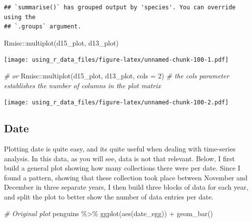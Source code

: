 \documentclass[
]{book}
\newenvironment{Shaded}{\begin{snugshade}}{\end{snugshade}}
\newcommand{\AttributeTok}[1]{\textcolor[rgb]{0.77,0.63,0.00}{#1}}
\newcommand{\CommentTok}[1]{\textcolor[rgb]{0.56,0.35,0.01}{\textit{#1}}}
\newcommand{\DecValTok}[1]{\textcolor[rgb]{0.00,0.00,0.81}{#1}}
\newcommand{\FunctionTok}[1]{\textcolor[rgb]{0.00,0.00,0.00}{#1}}
\newcommand{\NormalTok}[1]{#1}
\newcommand{\SpecialCharTok}[1]{\textcolor[rgb]{0.00,0.00,0.00}{#1}}
\begin{document}
\begin{verbatim}
## `summarise()` has grouped output by 'species'. You can override using the
## `.groups` argument.
\end{verbatim}

\begin{Shaded}
\begin{Highlighting}[]
\NormalTok{Rmisc}\SpecialCharTok{::}\FunctionTok{multiplot}\NormalTok{(d15\_plot, d13\_plot)}
\end{Highlighting}
\end{Shaded}

\texttt{[image: using\_r\_data\_files/figure-latex/unnamed-chunk-100-1.pdf]}

\begin{Shaded}
\begin{Highlighting}[]
\CommentTok{\# or}
\NormalTok{Rmisc}\SpecialCharTok{::}\FunctionTok{multiplot}\NormalTok{(d15\_plot, d13\_plot, }\AttributeTok{cols =} \DecValTok{2}\NormalTok{)  }\CommentTok{\# the cols parameter establishes the number of columns in the plot matrix}
\end{Highlighting}
\end{Shaded}

\texttt{[image: using\_r\_data\_files/figure-latex/unnamed-chunk-100-2.pdf]}

\hypertarget{date-1}{%
\subsection{Date}\label{date-1}}

Plotting date is quite easy, and its quite useful when dealing with time-series analysis.
In this data, as you will see, data is not that relevant.
Below, I first build a general plot showing how many collections there were per date.
Since I found a pattern, showing that these collection took place between November and December in three separate years, I then build three blocks of data for each year, and split the plot to better show the number of data entries per date.

\begin{Shaded}
\begin{Highlighting}[]
\CommentTok{\# Original plot}
\NormalTok{penguins }\SpecialCharTok{\%\textgreater{}\%} 
  \FunctionTok{ggplot}\NormalTok{(}\FunctionTok{aes}\NormalTok{(date\_egg)) }\SpecialCharTok{+}
  \FunctionTok{geom\_bar}\NormalTok{()}
\end{Highlighting}
\end{Shaded}
\end{document}
